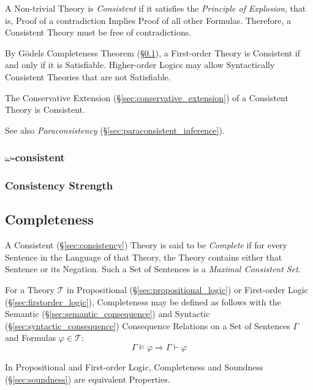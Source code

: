 A Non-trivial Theory is \emph{Consistent} if it satisfies the
\emph{Principle of Explosion}, that is, Proof of a contradiction
Implies Proof of all other Formulas. Therefore, a Consistent Theory must
be free of contradictions.

By G\"odels Completeness Theorem (\S\ref{sec:completeness}), a
First-order Theory is Consistent if and only if it is Satisfiable.
Higher-order Logics may allow Syntactically Consistent Theories that
are not Satisfiable.

The Conservative Extension (\S\ref{sec:conservative_extension}) of a
Consistent Theory is Consistent.

See also \emph{Paraconsistency} (\S\ref{sec:paraconsistent_inference}).



\subsubsection{$\omega$-consistent}\label{sec:omega_consistent}

\subsubsection{Consistency Strength}\label{sec:consistency_strength}



\subsection{Completeness}\label{sec:completeness}

A Consistent (\S\ref{sec:consistency}) Theory is said to be
\emph{Complete} if for every Sentence in the Language of that Theory,
the Theory contains either that Sentence or its Negation. Such a Set
of Sentences is a \emph{Maximal Consistent Set}.

For a Theory $\mathcal{T}$ in Propositional
(\S\ref{sec:propositional_logic}) or First-order Logic
(\S\ref{sec:firstorder_logic}), Completeness may be defined as follows
with the Semantic (\S\ref{sec:semantic_consequence}) and Syntactic
(\S\ref{sec:syntactic_consequence}) Consequence Relations on a Set of
Sentences $\Gamma$ and Formulas $\varphi \in \mathcal{T}$:
\[
  \Gamma \vDash \varphi \Rightarrow \Gamma \vdash \varphi
\]

In Propositional and First-order Logic, Completeness and Soundness
(\S\ref{sec:soundness}) are equivalent Properties.



